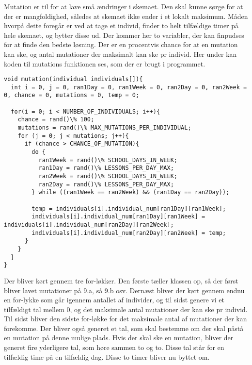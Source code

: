 Mutation er til for at lave små ændringer i skemaet. Den skal kunne sørge for at der er mangfoldighed, således at skemaet ikke ender i et lokalt maksimum. 
Måden hvorpå dette foregår er ved at tage et individ, finder to helt tilfældige timer på hele skemaet, og bytter disse ud. Der kommer her to variabler, der kan finpudses for at finde den bedste løsning. Der er en procentvis chance for at en mutation kan ske, og antal mutationer der maksimalt kan ske pr individ. 
Her under kan koden til mutations funktionen ses, som der er brugt i programmet.
\begin{lstlisting}
void mutation(individual individuals[]){
  int i = 0, j = 0, ran1Day = 0, ran1Week = 0, ran2Day = 0, ran2Week = 0, chance = 0, mutations = 0, temp = 0;

  for(i = 0; i < NUMBER_OF_INDIVIDUALS; i++){
    chance = rand()\% 100;
    mutations = rand()\% MAX_MUTATIONS_PER_INDIVIDUAL;
    for (j = 0; j < mutations; j++){
      if (chance > CHANCE_OF_MUTATION){
        do {
          ran1Week = rand()\% SCHOOL_DAYS_IN_WEEK;
          ran1Day = rand()\% LESSONS_PER_DAY_MAX;
          ran2Week = rand()\% SCHOOL_DAYS_IN_WEEK;
          ran2Day = rand()\% LESSONS_PER_DAY_MAX;
        } while ((ran1Week == ran2Week) && (ran1Day == ran2Day));
        
        temp = individuals[i].individual_num[ran1Day][ran1Week];
        individuals[i].individual_num[ran1Day][ran1Week] =        individuals[i].individual_num[ran2Day][ran2Week];
        individuals[i].individual_num[ran2Day][ran2Week] = temp;
      }
    }
  }
}
\end{lstlisting}

Der bliver kørt gennem tre for-løkker. Den første tæller klassen op, så der først bliver lavet mutationer på 9.a, så 9.b osv. Dernæst bliver der kørt gennem endnu en for-lykke som går igennem antallet af individer, og til sidst genere vi et tilfældigt tal mellem 0, og det maksimale antal mutationer der kan ske pr individ. Til sidst bliver den sidste for-løkke for det maksimale antal af mutationer der kan forekomme. Der bliver også generet et tal, som skal bestemme om der skal påstå en mutation på denne mulige plads. Hvis der skal ske en mutation, bliver der generet fire yderligere tal, som høre sammen to og to. Disse tal står for en tilfældig time på en tilfældig dag. Disse to timer bliver nu byttet om. 
